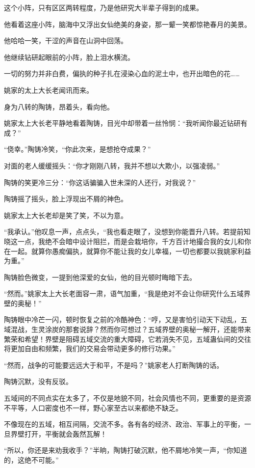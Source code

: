 \begin{this_body}
这个小阵，只有区区两转程度，乃是他研究大半辈子得到的成果。

他看着这座小阵，脑海中又浮出女仙绝美的身姿，那一颦一笑都惊艳春月的美景。

他哈哈一笑，干涩的声音在山洞中回荡。

他继续钻研起眼前的小阵，脸上泪水横流。

一切的努力并非白费，偏执的种子扎在浸染心血的泥土中，也开出暗色的花……

姚家的太上大长老闻讯而来。

身为八转的陶铸，昂着头，看向他。

姚家太上大长老平静地看着陶铸，目光中却带着一丝怜悯：“我听闻你最近钻研有成？”

“侥幸。”陶铸冷笑，“你此次来，是想抢夺成果？”

对面的老人缓缓摇头：“你才刚刚八转，我并不想以大欺小，以强凌弱。”

陶铸的笑更冷三分：“你这话骗骗入世未深的人还行，对我说？”

陶铸摇了摇头，脸上浮现出不屑的神色。

姚家太上大长老却是笑了笑，不以为意。

“我承认。”他叹息一声，点点头，“我也看走眼了，没想到你能晋升八转。若提前知晓这一点，我绝不会暗中设计阻拦，而是会栽培你，千方百计地撮合我的女儿和你在一起。就算你愚痴偏执，就算你不能让我的女儿幸福，一切也都要以我姚家利益为重。”

陶铸脸色微变，一提到他深爱的女仙，他的目光顿时晦暗下去。

“然而。”姚家太上大长老面容一肃，语气加重，“我是绝对不会让你研究什么五域界壁的奥秘！”

陶铸眼中冷芒一闪，顿时恢复之前的冷酷神色：“哼，又是害怕引动天下动乱，五域混战，生灵涂炭的那套说辞？然而你可想过？五域界壁的奥秘一解开，还能带来繁荣和希望！界壁是阻碍五域交流的重大障碍，它若消失不见，五域蛊仙间的交往将更加自由和频繁，我们的交易会带动更多的修行功果。”

“然而，战争的可能要远远大于和平，不是吗？”姚家老人打断陶铸的话。

陶铸沉默，没有反驳。

五域间的不同点实在太多了，不仅是地貌不同，社会风情也不同，更重要的是资源不平等，人口密度也不一样，野心家至古以来都绝不缺乏。

不像现在的五域，相互间隔，交流不多。各有各的经济、政治、军事上的平衡，一旦界壁打开，平衡就会轰然瓦解！

“所以，你还是来劝我收手？”半晌，陶铸打破沉默，他不屑地冷笑一声，“你知道的，这绝不可能。”


\end{this_body}

